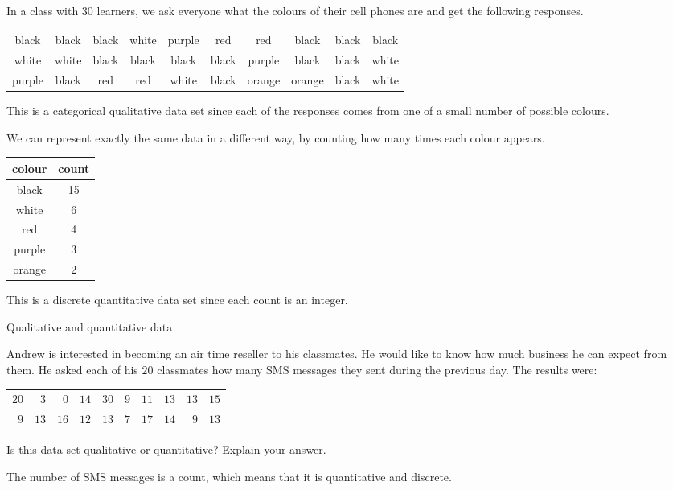 \begin{example}
  In a class with $30$ learners, we ask everyone what the colours of
  their cell phones are and get the following responses.

  \begin{center}
    \begin{tabular}{cccccccccc}
      \toprule
      black & black & black & white & purple & red & red & black & black & black \\
      white & white & black & black & black & black & purple & black & black & white \\
      purple & black & red & red & white & black & orange & orange & black & white \\
      \bottomrule
    \end{tabular}
  \end{center}

  This is a categorical qualitative data set since each of the
  responses comes from one of a small number of possible colours.

  We can represent exactly the same data in a different way, by
  counting how many times each colour appears.

  \begin{center}
    \begin{tabular}{cc}
      \toprule
      colour & count \\
      \midrule
      black & 15 \\
      white & 6 \\
      red & 4 \\
      purple & 3 \\
      orange & 2\\
      \bottomrule
    \end{tabular}
  \end{center}

  This is a discrete quantitative data set since each count is an
  integer.

\end{example}

\begin{wex}{Qualitative and quantitative data}{
    Andrew is interested in becoming an air time reseller to his
    classmates. He would like to know how much business he can expect
    from them. He asked each of his $20$ classmates how many SMS
    messages they sent during the previous day. The results were:

    \begin{center}
      \begin{tabular}{rrrrrrrrrr}
        \toprule
        $20$ & $ 3$ & $ 0$ & $14$ & $30$ & $9$ & $11$ & $13$ & $13$ & $15$ \\
         $9$ & $13$ & $16$ & $12$ & $13$ & $7$ & $17$ & $14$ & $ 9$ & $13$ \\
        \bottomrule
      \end{tabular}
    \end{center}

    Is this data set qualitative or quantitative? Explain your answer.
}{
  The number of SMS messages is a count, which means that it is
  quantitative and discrete.

}
\end{wex}

